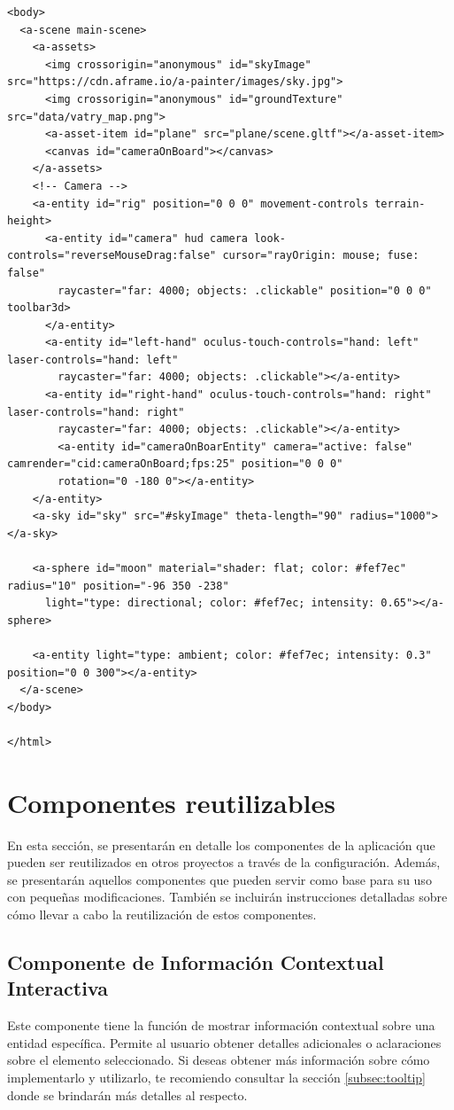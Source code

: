 \documentclass[a4paper, 11pt]{book}
\begin{document}
\begin{verbatim}
<body>
  <a-scene main-scene>
    <a-assets>
      <img crossorigin="anonymous" id="skyImage" src="https://cdn.aframe.io/a-painter/images/sky.jpg">
      <img crossorigin="anonymous" id="groundTexture" src="data/vatry_map.png">
      <a-asset-item id="plane" src="plane/scene.gltf"></a-asset-item>
      <canvas id="cameraOnBoard"></canvas>
    </a-assets>
    <!-- Camera -->
    <a-entity id="rig" position="0 0 0" movement-controls terrain-height>
      <a-entity id="camera" hud camera look-controls="reverseMouseDrag:false" cursor="rayOrigin: mouse; fuse: false"
        raycaster="far: 4000; objects: .clickable" position="0 0 0" toolbar3d>
      </a-entity>
      <a-entity id="left-hand" oculus-touch-controls="hand: left" laser-controls="hand: left"
        raycaster="far: 4000; objects: .clickable"></a-entity>
      <a-entity id="right-hand" oculus-touch-controls="hand: right" laser-controls="hand: right"
        raycaster="far: 4000; objects: .clickable"></a-entity>
        <a-entity id="cameraOnBoarEntity" camera="active: false" camrender="cid:cameraOnBoard;fps:25" position="0 0 0"
        rotation="0 -180 0"></a-entity>
    </a-entity>
    <a-sky id="sky" src="#skyImage" theta-length="90" radius="1000"></a-sky>

    <a-sphere id="moon" material="shader: flat; color: #fef7ec" radius="10" position="-96 350 -238"
      light="type: directional; color: #fef7ec; intensity: 0.65"></a-sphere>

    <a-entity light="type: ambient; color: #fef7ec; intensity: 0.3" position="0 0 300"></a-entity>
  </a-scene>
</body>

</html>
\end{verbatim}
\section{Componentes reutilizables}
\label{sec:componentesreutilizables}
En esta sección, se presentarán en detalle los componentes de la aplicación que pueden ser reutilizados en otros proyectos a través de la configuración. Además, se presentarán aquellos componentes que pueden servir como base para su uso con pequeñas modificaciones. También se incluirán instrucciones detalladas sobre cómo llevar a cabo la reutilización de estos componentes.
\subsection{Componente de Información Contextual Interactiva}
Este componente tiene la función de mostrar información contextual sobre una entidad específica. Permite al usuario obtener detalles adicionales o aclaraciones sobre el elemento seleccionado. Si deseas obtener más información sobre cómo implementarlo y utilizarlo, te recomiendo consultar la sección \ref{subsec:tooltip} donde se brindarán más detalles al respecto.
\end{document}
